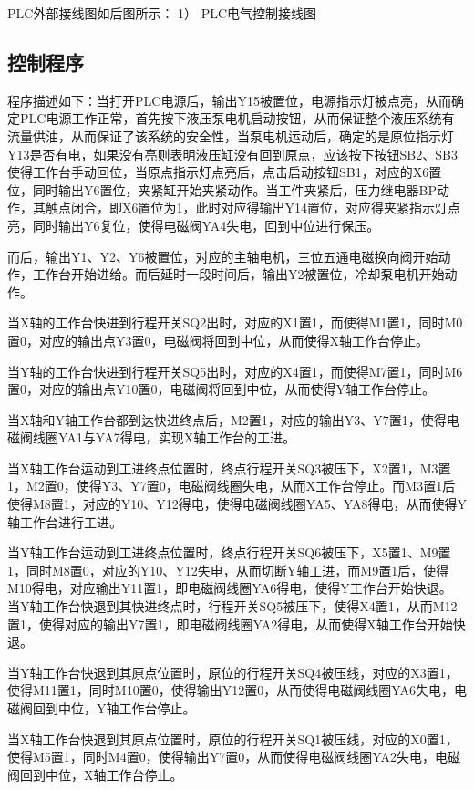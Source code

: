 PLC外部接线图如后图所示：
1）	PLC电气控制接线图

\subsection{控制程序}
程序描述如下：当打开PLC电源后，输出Y15被置位，电源指示灯被点亮，从而确定PLC电源工作正常，首先按下液压泵电机启动按钮，从而保证整个液压系统有流量供油，从而保证了该系统的安全性，当泵电机运动后，确定的是原位指示灯Y13是否有电，如果没有亮则表明液压缸没有回到原点，应该按下按钮SB2、SB3使得工作台手动回位，当原点指示灯点亮后，点击启动按钮SB1，对应的X6置位，同时输出Y6置位，夹紧缸开始夹紧动作。当工件夹紧后，压力继电器BP动作，其触点闭合，即X6置位为1，此时对应得输出Y14置位，对应得夹紧指示灯点亮，同时输出Y6复位，使得电磁阀YA4失电，回到中位进行保压。

而后，输出Y1、Y2、Y6被置位，对应的主轴电机，三位五通电磁换向阀开始动作，工作台开始进给。而后延时一段时间后，输出Y2被置位，冷却泵电机开始动作。

当X轴的工作台快进到行程开关SQ2出时，对应的X1置1，而使得M1置1，同时M0置0，对应的输出点Y3置0，电磁阀将回到中位，从而使得X轴工作台停止。

当Y轴的工作台快进到行程开关SQ5出时，对应的X4置1，而使得M7置1，同时M6置0，对应的输出点Y10置0，电磁阀将回到中位，从而使得Y轴工作台停止。

当X轴和Y轴工作台都到达快进终点后，M2置1，对应的输出Y3、Y7置1，使得电磁阀线圈YA1与YA7得电，实现X轴工作台的工进。

当X轴工作台运动到工进终点位置时，终点行程开关SQ3被压下，X2置1，M3置1，M2置0，使得Y3、Y7置0，电磁阀线圈失电，从而X工作台停止。而M3置1后使得M8置1，对应的Y10、Y12得电，使得电磁阀线圈YA5、YA8得电，从而使得Y轴工作台进行工进。

当Y轴工作台运动到工进终点位置时，终点行程开关SQ6被压下，X5置1、M9置1，同时M8置0，对应的Y10、Y12失电，从而切断Y轴工进，而M9置1后，使得M10得电，对应输出Y11置1，即电磁阀线圈YA6得电，使得Y工作台开始快退。
当Y轴工作台快退到其快进终点时，行程开关SQ5被压下，使得X4置1，从而M12置1，使得对应的输出Y7置1，即电磁阀线圈YA2得电，从而使得X轴工作台开始快退。

当Y轴工作台快退到其原点位置时，原位的行程开关SQ4被压线，对应的X3置1，使得M11置1，同时M10置0，使得输出Y12置0，从而使得电磁阀线圈YA6失电，电磁阀回到中位，Y轴工作台停止。

当X轴工作台快退到其原点位置时，原位的行程开关SQ1被压线，对应的X0置1，使得M5置1，同时M4置0，使得输出Y7置0，从而使得电磁阀线圈YA2失电，电磁阀回到中位，X轴工作台停止。

